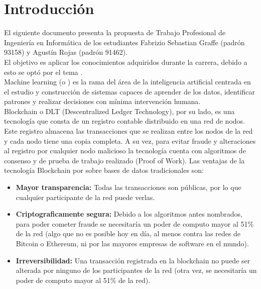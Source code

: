 \documentclass[
11pt, %
oneside, %
spanish, %
singlespacing, %
headsepline, %
chapterinoneline, %
]{MastersDoctoralThesis} %
\begin{document}

\tableofcontents %


\mainmatter %

\pagestyle{thesis} %

\chapter{Introducci\'on}
El siguiente documento presenta la propuesta de Trabajo Profesional de Ingeniería en Informática de los estudiantes Fabrizio Sebastian Graffe (padrón 93158) y Agustín Rojas (padrón 91462). \\

El objetivo es aplicar los conocimientos adquiridos durante la carrera, debido a esto se optó por el tema \textbf{ }. \\

Machine learning (o ) es la rama del área de la inteligencia artificial centrada en el estudio y construcción de sistemas capaces de aprender de los datos, identificar patrones y realizar decisiones con mínima intervención humana. \\

Blockchain \cite{bc} o DLT (Descentralized Ledger Technology), por su lado, es una tecnología que consta de un registro contable distribuido en una red de nodos. Este registro almacena las transacciones que se realizan entre los nodos de la red y cada nodo tiene una copia completa. A su vez, para evitar fraude y alteraciones al registro por cualquier nodo malicioso la tecnología cuenta con algoritmos de consenso y de prueba de trabajo realizado (Proof of Work).
Las ventajas de la tecnología Blockchain por sobre bases de datos tradicionales son:
\begin{itemize}
\item \textbf{Mayor transparencia:} Todas las transacciones son públicas, por lo que cualquier participante de la red puede verlas.
\item \textbf{Criptograficamente segura:} Debido a los algoritmos antes nombrados, para poder cometer fraude se necesitaría un poder de computo mayor al 51\% de la red (algo que no es posible hoy en día, al menos contra las redes de Bitcoin o Ethereum, ni por las mayores empresas de software en el mundo).
\item \textbf{Irreversibilidad:} Una transacción registrada en la blockchain no puede ser alterada por ninguno de los participantes de la red (otra vez, se necesitaría un poder de computo mayor al 51\% de la red).
\end{itemize}
\end{document}
